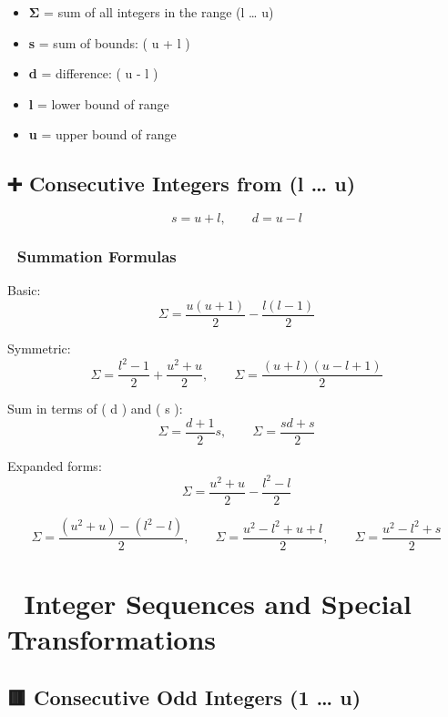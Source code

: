 \documentclass[
  letterpaper,
]{book}
\providecommand{\tightlist}{%
  \setlength{\itemsep}{0pt}\setlength{\parskip}{0pt}}
\begin{document}
\begin{itemize}
\tightlist
\item
  \textbf{Σ} = sum of all integers in the range (l \ldots{} u)\\
\item
  \textbf{s} = sum of bounds: ( u + l )\\
\item
  \textbf{d} = difference: ( u - l )\\
\item
  \textbf{l} = lower bound of range\\
\item
  \textbf{u} = upper bound of range
\end{itemize}

\subsection{➕ Consecutive Integers from (l \ldots{}
u)}\label{consecutive-integers-from-l-u}

\[
s = u + l, \qquad d = u - l
\]

\subsubsection{🧮 Summation Formulas}\label{summation-formulas}

Basic: \[
\Sigma = \frac{u(u + 1)}{2} - \frac{l(l - 1)}{2}
\]

Symmetric: \[
\Sigma = \frac{l^2 - 1}{2} + \frac{u^2 + u}{2}, \qquad
\Sigma = \frac{(u + l)(u - l + 1)}{2}
\]

Sum in terms of ( d ) and ( s ): \[
\Sigma = \frac{d + 1}{2} s, \qquad
\Sigma = \frac{sd + s}{2}
\]

Expanded forms: \[
\Sigma = \frac{u^2 + u}{2} - \frac{l^2 - l}{2}
\]

\[
\Sigma = \frac{(u^2 + u) - (l^2 - l)}{2}, \qquad
\Sigma = \frac{u^2 - l^2 + u + l}{2}, \qquad
\Sigma = \frac{u^2 - l^2 + s}{2}
\]

\section{🔢 Integer Sequences and Special
Transformations}\label{integer-sequences-and-special-transformations}

\subsection{🟥 Consecutive Odd Integers (1 \ldots{}
u)}\label{consecutive-odd-integers-1-u}
\end{document}
